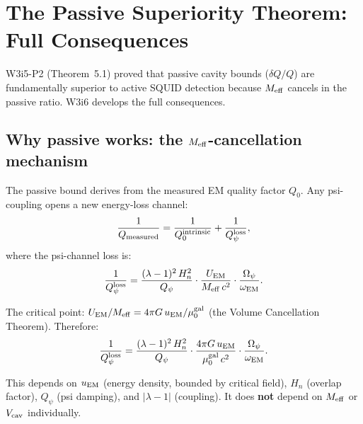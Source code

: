 \documentclass[11pt]{article}
\newcommand{\lam}{\lambda}
\newcommand{\Opsi}{\Omega_\psi}
\newcommand{\Meff}{M_{\rm eff}}
\newcommand{\Qpsi}{Q_\psi}
\newcommand{\Heff}{H_n}
\newcommand{\Vcav}{V_{\rm cav}}
\newcommand{\muG}{\mu_0^{\rm gal}}
\newcommand{\lbone}{|\lam - 1|}
\theoremstyle{definition}
\theoremstyle{remark}
\begin{document}
\section{The Passive Superiority Theorem: Full Consequences}
\label{sec:passive_superiority}

W3i5-P2 (Theorem~5.1) proved that passive cavity bounds ($\delta Q/Q$)
are fundamentally superior to active SQUID detection because $\Meff$
cancels in the passive ratio. W3i6 develops the full consequences.

\subsection{Why passive works: the $\Meff$-cancellation mechanism}
\label{ssec:cancellation}

The passive bound derives from the measured EM quality factor $Q_0$.
Any psi-coupling opens a new energy-loss channel:
\begin{equation}
\frac{1}{Q_{\rm measured}} = \frac{1}{Q_0^{\rm intrinsic}} +
\frac{1}{Q_\psi^{\rm loss}},
\label{eq:Q_decomposition}
\end{equation}
where the psi-channel loss is:
\begin{equation}
\frac{1}{Q_\psi^{\rm loss}} = \frac{(\lam-1)^2\,\Heff^2}{\Qpsi}
\cdot\frac{U_{\rm EM}}{\Meff\,c^2}\cdot\frac{\Opsi}{\omega_{\rm EM}}.
\label{eq:Q_psi_loss}
\end{equation}

The critical point: $U_{\rm EM}/\Meff = 4\pi G\,u_{\rm EM}/\muG$ (the
Volume Cancellation Theorem). Therefore:
\begin{equation}
\frac{1}{Q_\psi^{\rm loss}} = \frac{(\lam-1)^2\,\Heff^2}{\Qpsi}
\cdot\frac{4\pi G\,u_{\rm EM}}{\muG\,c^2}\cdot\frac{\Opsi}{\omega_{\rm EM}}.
\label{eq:Q_psi_loss_corrected}
\end{equation}

This depends on $u_{\rm EM}$ (energy density, bounded by critical field),
$\Heff$ (overlap factor), $\Qpsi$ (psi damping), and $\lbone$ (coupling).
It does \textbf{not} depend on $\Meff$ or $\Vcav$ individually.
\end{document}
